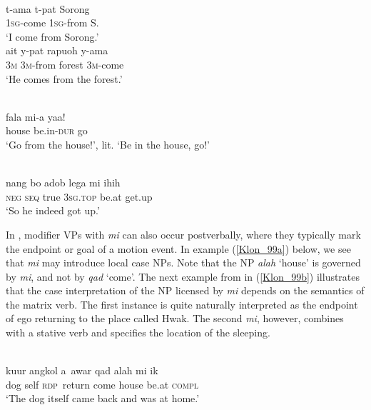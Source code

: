 \ea \label{Maybrat_60}
\\
\ea
\gll t-ama t-pat Sorong \\
1\textsc{sg}-come 1\textsc{sg}-from S. \\
\glft `I come from Sorong.' \\ 
\ex
\gll ait y-pat rapuoh y-ama \\ 
3\textsc{m} 3\textsc{m}-from forest 3\textsc{m}-come \\
\glft `He comes from the forest.'\\ 
\z
\z

\ea \label{Abui_24}
\\
\gll fala mi-a yaa! \\
house be.in-\textsc{dur} go \\
\glft `Go from the house!', lit. `Be in the house, go!’\\
\z

\ea \label{Klon_48}
\\
\gll nang bo adob lega mi ihih \\
\textsc{neg} \textsc{seq} true 3\textsc{sg}.\textsc{top} be.at get.up \\
\glft `So he indeed got up.'\\ 
\z

In , modifier VPs with \textit{mi} can also occur postverbally, where they typically mark the endpoint or goal of a motion event. In example (\ref{Klon_99a}) below, we see that \textit{mi} may introduce local case NPs. Note that the NP \textit{alah} `house' is governed by \textit{mi}, and not by \textit{qad} `come'. The next example from  in (\ref{Klon_99b}) illustrates that the case interpretation of the NP licensed by \textit{mi} depends on the semantics of the matrix verb. The first instance is quite naturally interpreted as the endpoint of ego returning to the place called Hwak. The second \textit{mi}, however, combines with a stative verb and specifies the location of the sleeping.

\ea \label{Klon_99a}
\\
\gll kuur angkol a~awar qad alah mi ik \\
dog self \textsc{rdp}~return come house be.at \textsc{compl} \\
\glft `The dog itself came back and was at home.'\\ 
\z

